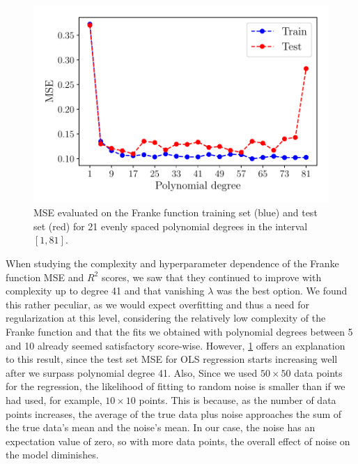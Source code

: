 \documentclass[aps,pra,english,notitlepage,reprint,nofootinbib]{revtex4-1}  %
\begin{document}
\begin{figure}[h!]
  \vspace*{-5pt}
  \centering %
  \includegraphics[width=\columnwidth]{../figs/e_MSE_train_test.pdf}
  \caption{MSE evaluated on the Franke function training set (blue) and test set (red) for 21 evenly spaced polynomial degrees in the interval $[1, 81]$.}\label{fig:e train test}
  \vspace*{-5pt}
\end{figure}

When studying the complexity and hyperparameter dependence of the Franke function MSE and $R^2$ scores, we saw that they continued to improve with complexity up to degree 41 and that vanishing $\lambda$ was the best option. We found this rather peculiar, as we would expect overfitting and thus a need for regularization at this level, considering the relatively low complexity of the Franke function and that the fits we obtained with polynomial degrees between 5 and 10 already seemed satisfactory score-wise. However, \cref{fig:e train test} offers an explanation to this result, since the test set MSE for OLS regression starts increasing well after we surpass polynomial degree 41. Also, Since we used $50\times50$ data points for the regression, the likelihood of fitting to random noise is smaller than if we had used, for example, $10\times10$ points. This is because, as the number of data points increases, the average of the true data plus noise approaches the sum of the true data's mean and the noise's mean. In our case, the noise has an expectation value of zero, so with more data points, the overall effect of noise on the model diminishes. 
\end{document}
